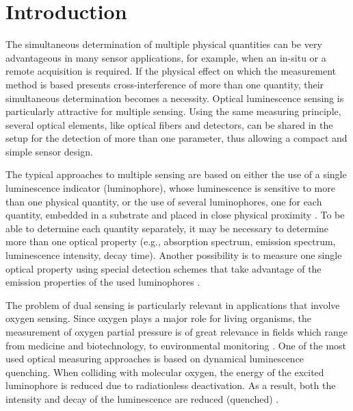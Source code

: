 \documentclass[sensors,article,submit,moreauthors,pdftex,10pt,a4paper]{Definitions/mdpi}
\begin{document}


\section{Introduction}
\label{Introduction}

The simultaneous determination of multiple physical quantities can be very advantageous in many sensor applications, for example, when an in-situ or a remote acquisition is required. 
If the physical effect on which the measurement method is based presents cross-interference of more than one quantity, their simultaneous determination becomes a necessity.
Optical luminescence sensing is particularly attractive for multiple sensing. Using the same measuring principle, several optical elements, like optical fibers and detectors, can be shared in the setup for the detection of more than one parameter, thus allowing a compact and simple sensor design.

The typical approaches to multiple sensing are based on either the use of a single luminescence indicator (luminophore), whose luminescence is sensitive to more than one physical quantity, or the use of several luminophores, one for each quantity, embedded in a substrate and placed in close physical proximity \cite{Stich2010,Borisov2011novel,Kameya2014,Wang2014,Santoro2016,Biring2019}. To be able to determine each quantity separately, it may be necessary to determine more than one optical property (e.g., absorption spectrum, emission spectrum, luminescence intensity, decay time). Another possibility is to measure one single optical property using special detection schemes that take advantage of the emission properties of the used luminophores \cite{Wang2014,Biring2019,Collier2013,Stehning2004,Jorge2008,Moore2006}. 

The problem of dual sensing is particularly relevant in applications that involve oxygen sensing. Since oxygen plays a major role for living organisms, the measurement of oxygen partial pressure is of great relevance in fields which range from medicine and  biotechnology, to environmental monitoring \cite{Papkovsky2013,Wang2014}. One of the most used optical measuring approaches is based on dynamical luminescence quenching. When colliding with molecular oxygen, the energy of the excited luminophore is reduced due to radiationless deactivation. As a result, both the intensity and decay of the luminescence are reduced (quenched) \cite{Lakowicz2006}.
\end{document}
